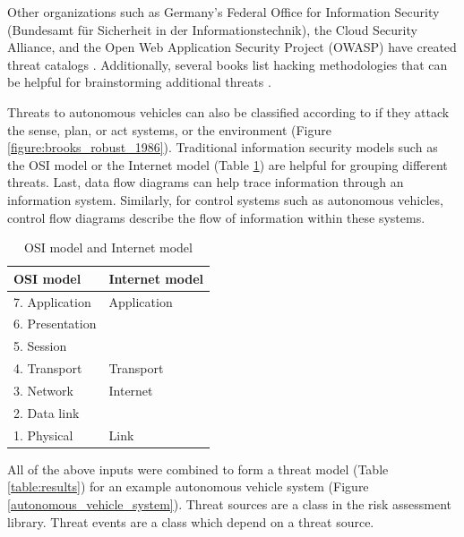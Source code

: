 \documentclass{article}
\begin{document}
Other organizations such as Germany's Federal Office for Information Security (Bundesamt f\"{u}r Sicherheit in der Informationstechnik), the Cloud Security Alliance, and the Open Web Application Security Project (OWASP) have created threat catalogs \citep{bundesamt_fur_sicherheit_in_der_informationstechnik_elementary_2008, cloud_security_alliance_top_threats_working_group_treacherous_2016, open_web_application_security_project_owasp_2017}. Additionally, several books list hacking methodologies that can be helpful for brainstorming additional threats \citep{mcnab_network_2007, smith_car_2016}.

Threats to autonomous vehicles can also be classified according to if they attack the sense, plan, or act systems, or the environment (Figure \ref{figure:brooks_robust_1986}). Traditional information security models such as the OSI model or the Internet model (Table \ref{table:osimodel_internetmodel}) are helpful for grouping different threats. Last, data flow diagrams can help trace information through an information system. Similarly, for control systems such as autonomous vehicles, control flow diagrams describe the flow of information within these systems.

\begin{table}[h]\begin{center}
    \begin{tabular}{l | l}
        OSI model & Internet model \\
        \hline
        7. Application & Application \\
        6. Presentation & \\
        5. Session & \\
        4. Transport & Transport \\
        3. Network &  Internet \\
        2. Data link &  \\
        1. Physical & Link \\
    \end{tabular}
    \caption{OSI model \citep{international_organization_for_standardization_iso/iec_1994} and Internet model \citep{braden_rfc_1989}}
    \label{table:osimodel_internetmodel}
\end{center} \end{table}

All of the above inputs were combined to form a threat model (Table \ref{table:results}) for an example autonomous vehicle system (Figure \ref{autonomous_vehicle_system}). Threat sources are a class in the risk assessment library. Threat events are a class which depend on a threat source.
\end{document}
